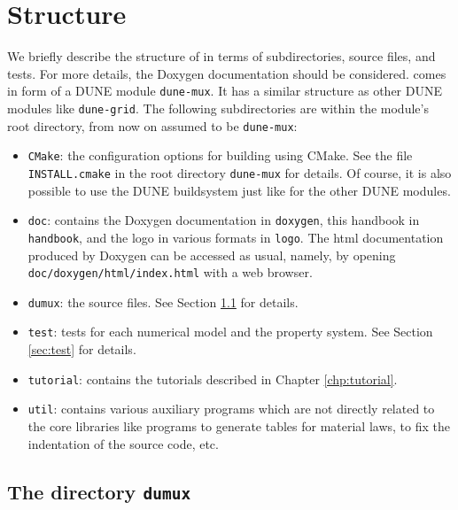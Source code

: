 \chapter{Structure}

We briefly describe the structure of \Dumux in terms 
of subdirectories, source files, and tests. For more details, 
the Doxygen documentation should be considered. 
\Dumux comes in form of a DUNE module \texttt{dune-mux}. 
It has a similar structure as other DUNE modules like \texttt{dune-grid}. 
The following subdirectories are within the module's root directory, 
from now on assumed to be \texttt{dune-mux}: 
\begin{itemize} 
\item \texttt{CMake}: the configuration options 
for building \Dumux using CMake. See the file \texttt{INSTALL.cmake} in 
the root directory \texttt{dune-mux} for details. Of course, 
it is also possible to use the DUNE buildsystem just like for the other 
DUNE modules.
\item \texttt{doc}: contains the Doxygen documentation in \texttt{doxygen}, 
this handbook in \texttt{handbook}, and the \Dumux logo in various formats in 
\texttt{logo}. The html documentation produced by Doxygen can be accessed as usual, 
namely, by opening \texttt{doc/doxygen/html/index.html} with a web browser. 
\item \texttt{dumux}: the \Dumux source files. See Section \ref{sec:dumux} for details. 
\item \texttt{test}: tests for each numerical model and the property system. 
See Section \ref{sec:test} for details. 
\item \texttt{tutorial}: contains the tutorials described in Chapter \ref{chp:tutorial}. 
\item \texttt{util}:   contains various auxiliary programs which are not
directly related to the core \Dumux libraries like programs to generate
tables for material laws, to fix the indentation of the source code,
etc.
\end{itemize}



\section{The directory \texttt{dumux}}\label{sec:dumux}

